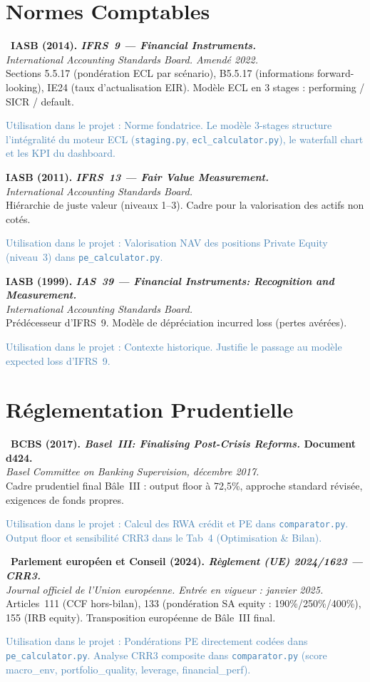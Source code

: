 \documentclass[12pt,a4paper]{article}
\newcommand{\bibentry}[4]{%
  \noindent\textbf{#1}\\
  \textit{#2}\\
  #3\par
  \textcolor{steelblue}{\footnotesize\textsf{Utilisation dans le projet :} #4}\par
  \medskip
}
\newcommand{\bibentrystar}[4]{%
  \noindent{\color{goldstar}$\bigstar$}~\textbf{#1}\\
  \textit{#2}\\
  #3\par
  \textcolor{steelblue}{\footnotesize\textsf{Utilisation dans le projet :} #4}\par
  \medskip
}
\begin{document}
\section{Normes Comptables}

\bibentrystar{IASB (2014). \emph{IFRS~9 --- Financial Instruments.}}{International Accounting Standards Board. Amendé 2022.}{Sections 5.5.17 (pondération ECL par scénario), B5.5.17 (informations forward-looking), IE24 (taux d'actualisation EIR). Modèle ECL en 3 stages : performing / SICR / default.}{Norme fondatrice. Le modèle 3-stages structure l'intégralité du moteur ECL (\texttt{staging.py}, \texttt{ecl\_calculator.py}), le waterfall chart et les KPI du dashboard.}

\bibentry{IASB (2011). \emph{IFRS~13 --- Fair Value Measurement.}}{International Accounting Standards Board.}{Hiérarchie de juste valeur (niveaux 1--3). Cadre pour la valorisation des actifs non cotés.}{Valorisation NAV des positions Private Equity (niveau~3) dans \texttt{pe\_calculator.py}.}

\bibentry{IASB (1999). \emph{IAS~39 --- Financial Instruments: Recognition and Measurement.}}{International Accounting Standards Board.}{Prédécesseur d'IFRS~9. Modèle de dépréciation \og incurred loss\fg{} (pertes avérées).}{Contexte historique. Justifie le passage au modèle \og expected loss\fg{} d'IFRS~9.}

\section{Réglementation Prudentielle}

\bibentrystar{BCBS (2017). \emph{Basel~III: Finalising Post-Crisis Reforms.} Document d424.}{Basel Committee on Banking Supervision, décembre 2017.}{Cadre prudentiel final Bâle~III : output floor à 72,5\%, approche standard révisée, exigences de fonds propres.}{Calcul des RWA crédit et PE dans \texttt{comparator.py}. Output floor et sensibilité CRR3 dans le Tab~4 (Optimisation \& Bilan).}

\bibentrystar{Parlement européen et Conseil (2024). \emph{Règlement (UE) 2024/1623 --- CRR3.}}{Journal officiel de l'Union européenne. Entrée en vigueur : janvier 2025.}{Articles~111 (CCF hors-bilan), 133 (pondération SA equity : 190\%/250\%/400\%), 155 (IRB equity). Transposition européenne de Bâle~III final.}{Pondérations PE directement codées dans \texttt{pe\_calculator.py}. Analyse CRR3 composite dans \texttt{comparator.py} (score macro\_env, portfolio\_quality, leverage, financial\_perf).}
\end{document}
